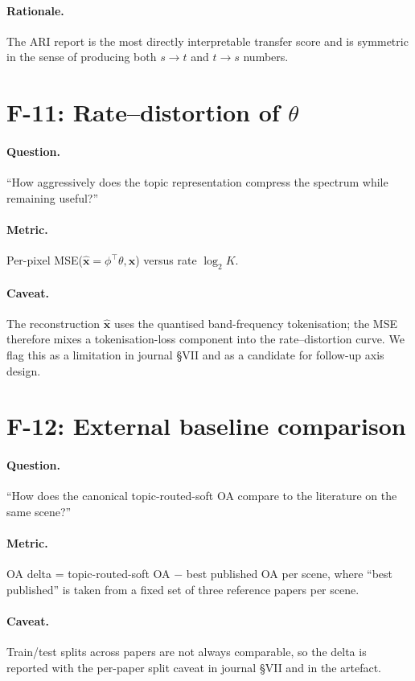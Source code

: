 \documentclass[11pt,a4paper]{article}
\begin{document}
\paragraph{Rationale.} The ARI report is the most directly
interpretable transfer score and is symmetric in the sense of
producing both $s \to t$ and $t \to s$ numbers.

\section{F-11: Rate--distortion of $\theta$}

\paragraph{Question.} ``How aggressively does the topic
representation compress the spectrum while remaining useful?''

\paragraph{Metric.} Per-pixel MSE($\hat{\mathbf{x}} = \phi^\top
\theta, \mathbf{x}$) versus rate $\log_2 K$.

\paragraph{Caveat.} The reconstruction $\hat{\mathbf{x}}$ uses the
quantised band-frequency tokenisation; the MSE therefore mixes a
tokenisation-loss component into the rate--distortion curve. We
flag this as a limitation in journal §VII and as a candidate for
follow-up axis design.

\section{F-12: External baseline comparison}

\paragraph{Question.} ``How does the canonical topic-routed-soft OA
compare to the literature on the same scene?''

\paragraph{Metric.} OA delta = topic-routed-soft OA $-$ best
published OA per scene, where ``best published'' is taken from a
fixed set of three reference papers per scene.

\paragraph{Caveat.} Train/test splits across papers are not always
comparable, so the delta is reported with the per-paper split
caveat in journal §VII and in the artefact.



\end{document}
